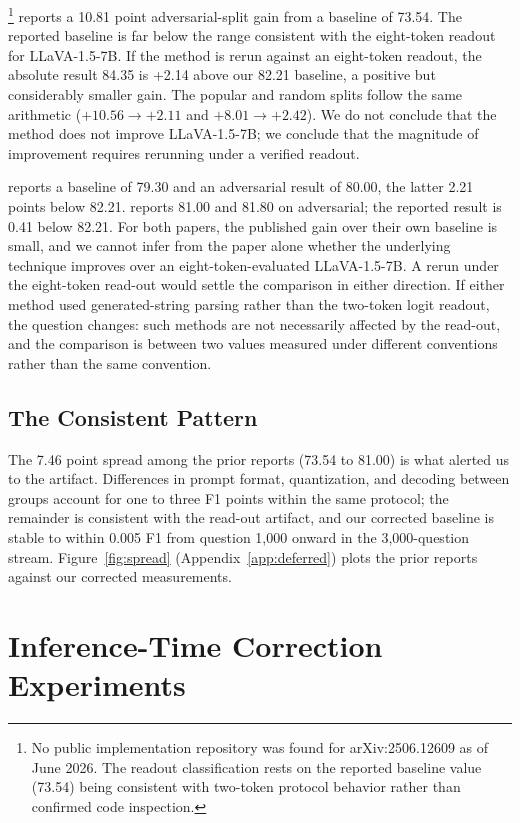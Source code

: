 \documentclass{article}
\begin{document}
\citet{visflow2025}\footnote{No public implementation repository was
found for arXiv:2506.12609 as of June 2026. The readout classification
rests on the reported baseline value (73.54) being consistent with
two-token protocol behavior rather than confirmed code inspection.}
reports a 10.81 point adversarial-split gain from
a baseline of 73.54. The reported baseline is far below the range
consistent with the eight-token readout for LLaVA-1.5-7B. If the
method is rerun against an eight-token readout, the absolute result
84.35 is +2.14 above our 82.21 baseline, a positive but considerably
smaller gain. The popular and random splits follow the same arithmetic
($+10.56 \to +2.11$ and $+8.01 \to +2.42$). We do not conclude that
the method does not improve LLaVA-1.5-7B; we conclude that the
magnitude of improvement requires rerunning under a verified readout.

\citet{seo2025} reports a baseline of 79.30 and an adversarial result
of 80.00, the latter 2.21 points below 82.21.
\citet{adaptvis2025} reports 81.00 and 81.80 on adversarial; the
reported result is 0.41 below 82.21. For both papers, the published
gain over their own baseline is small, and we cannot infer from the
paper alone whether the underlying technique improves over an
eight-token-evaluated LLaVA-1.5-7B. A rerun under the eight-token
read-out would settle the comparison in either direction. If either
method used generated-string parsing rather than the two-token
logit readout, the question changes: such methods are not necessarily
affected by the read-out, and the comparison is between two values
measured under different conventions rather than the same convention.

\subsection{The Consistent Pattern}

The 7.46 point spread among the prior reports (73.54 to 81.00) is what
alerted us to the artifact. Differences in prompt format, quantization,
and decoding between groups account for one to three F1 points within
the same protocol; the remainder is consistent with the read-out
artifact, and our corrected baseline is stable to within 0.005 F1 from
question 1{,}000 onward in the 3{,}000-question stream.
Figure~\ref{fig:spread} (Appendix~\ref{app:deferred}) plots the prior
reports against our corrected measurements.

\section{Inference-Time Correction Experiments}
\label{sec:correction}
\end{document}
